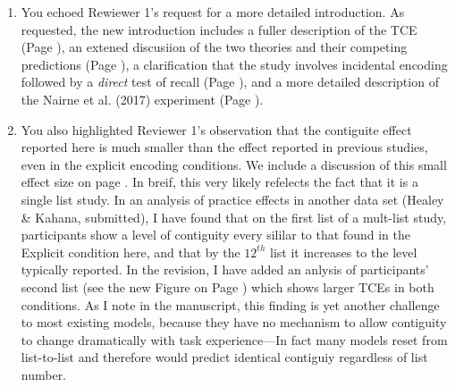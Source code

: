 \documentclass[12pt]{article}
\begin{document}
\begin{enumerate}

\item
	You echoed Rewiewer 1's request for a more detailed introduction. As requested, the new introduction includes a fuller description of the TCE (Page \pageref{TODO-1}), %
	an extened discusiion of the two theories and their competing predictions (Page \pageref{TODO-2}),
	a clarification that the study involves incidental encoding followed by a \emph{direct} test of recall (Page  \pageref{TODO-3}),
	and a more detailed description of the Nairne et al. (2017) experiment (Page \pageref{TODO-4}).

\item
	You also highlighted Reviewer 1's observation that the contiguite effect reported here is much smaller than the effect reported in previous studies, even in the explicit encoding conditions. We include a discussion of this small effect size on page \pageref{TODO-5}. In breif, this very likely refelects the fact that it is a single list study. In an analysis of practice effects in another data set (Healey \& Kahana, submitted), I have found that on the first list of a mult-list study, participants show a level of contiguity every sililar to that found in the Explicit condition here, and that by the $12^{th}$ list it increases to the level typically reported. In the revision, I have added an anlysis of participants' second list (see the new Figure on Page \pageref{TODO-6}) which shows larger TCEs in both conditions.  As I note in the manuscript, this finding is yet another challenge to most existing models, because they have no mechanism to allow contiguity to change dramatically with task experience---In fact many models reset from list-to-list and therefore would predict identical contiguiy regardless of list number.


\end{enumerate}
\end{document}
